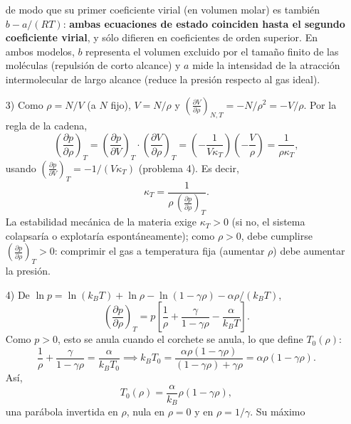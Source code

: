 \documentclass[12pt,a4paper]{article}
\newcommand{\paren}[1]{\left( #1 \right)}
\newcommand{\pd}[3]{\left(\frac{\partial #1}{\partial #2}\right)_{#3}}
\begin{document}
\begin{solucion}
\begin{enumerate}
            de modo que su primer coeficiente virial (en volumen molar) es también
            $b-a/(RT)$: \textbf{ambas ecuaciones de estado coinciden hasta el segundo
            coeficiente virial}, y sólo difieren en coeficientes de orden superior. En ambos
            modelos, $b$ representa el volumen excluido por el tamaño finito de las moléculas
            (repulsión de corto alcance) y $a$ mide la intensidad de la atracción intermolecular
            de largo alcance (reduce la presión respecto al gas ideal).
            \item[3)] Como $\rho=N/V$ (a $N$ fijo), $V=N/\rho$ y $\pd V\rho{N,T}=-N/\rho^{2}=-V/\rho$.
            Por la regla de la cadena,
            \begin{equation*}
                \pd p\rho T=\pd pVT\cdot\pd V\rho T=\paren{-\frac{1}{V\kappa_{T}}}\paren{-\frac{V}{\rho}}=\frac{1}{\rho\kappa_{T}},
            \end{equation*}
            usando $\pd pVT=-1/(V\kappa_{T})$ (problema 4). Es decir,
            \begin{equation*}
                \boxed{\kappa_{T}=\frac{1}{\rho\,\pd p\rho T}.}
            \end{equation*}
            La estabilidad mecánica de la materia exige $\kappa_{T}>0$ (si no, el sistema
            colapsaría o explotaría espontáneamente); como $\rho>0$, debe cumplirse
            $\pd p\rho T>0$: comprimir el gas a temperatura fija (aumentar $\rho$) debe aumentar
            la presión.
            \item[4)] De $\ln p=\ln(k_{B}T)+\ln\rho-\ln(1-\gamma\rho)-\alpha\rho/(k_{B}T)$,
            \begin{equation*}
                \pd p\rho T=p\left[\frac1\rho+\frac{\gamma}{1-\gamma\rho}-\frac{\alpha}{k_{B}T}\right].
            \end{equation*}
            Como $p>0$, esto se anula cuando el corchete se anula, lo que define $T_{0}(\rho)$:
            \begin{equation*}
                \frac1\rho+\frac{\gamma}{1-\gamma\rho}=\frac{\alpha}{k_{B}T_{0}}
                \implies
                k_{B}T_{0}=\frac{\alpha\rho(1-\gamma\rho)}{(1-\gamma\rho)+\gamma\rho}=\alpha\rho(1-\gamma\rho).
            \end{equation*}
            Así,
            \begin{equation*}
                T_{0}(\rho)=\frac{\alpha}{k_{B}}\rho(1-\gamma\rho),
            \end{equation*}
            una parábola invertida en $\rho$, nula en $\rho=0$ y en $\rho=1/\gamma$. Su máximo

\end{enumerate}
\end{solucion}
\end{document}
